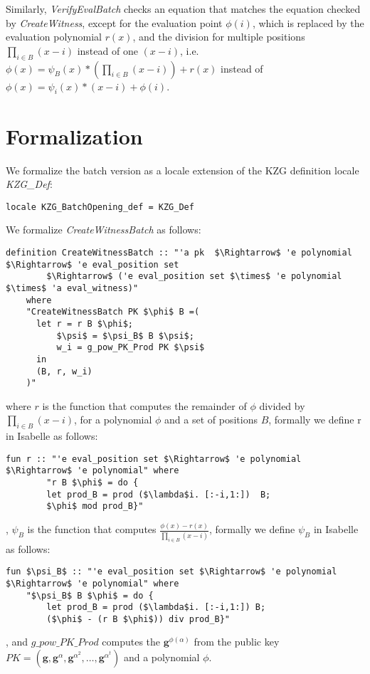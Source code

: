 Similarly, \textit{VerifyEvalBatch} checks an equation that matches the equation checked by \textit{CreateWitness}, except for the evaluation point $\phi(i)$, which is replaced by the evaluation polynomial $r(x)$, and the division for multiple positions $\prod_{i\in B}^{}(x-i)$ instead of one $(x-i)$, i.e. $\phi(x)=\psi_B(x)*(\prod_{i\in B}^{}(x-i)) + r(x)$ instead of $\phi(x)=\psi_i(x)*(x-i) + \phi(i)$.

\section*{Formalization}
We formalize the batch version as a locale extension of the KZG definition locale \textit{KZG\_Def}: 
\begin{lstlisting}[language=isabelle]
    locale KZG_BatchOpening_def = KZG_Def 
\end{lstlisting}

We formalize \textit{CreateWitnessBatch} as follows: 
\begin{lstlisting}[language=isabelle]
    definition CreateWitnessBatch :: "'a pk  $\Rightarrow$ 'e polynomial $\Rightarrow$ 'e eval_position set 
        $\Rightarrow$ ('e eval_position set $\times$ 'e polynomial $\times$ 'a eval_witness)"
    where
    "CreateWitnessBatch PK $\phi$ B =( 
      let r = r B $\phi$;
          $\psi$ = $\psi_B$ B $\psi$; 
          w_i = g_pow_PK_Prod PK $\psi$
      in
      (B, r, w_i)
    )"     
\end{lstlisting}
where $r$ is the function that computes the remainder of $\phi$ divided by $\prod_{i\in B}^{}(x-i)$, for a polynomial $\phi$ and a set of positions $B$, formally we define r in Isabelle as follows: 
\begin{lstlisting}[language=isabelle]
    fun r :: "'e eval_position set $\Rightarrow$ 'e polynomial $\Rightarrow$ 'e polynomial" where
        "r B $\phi$ = do {
        let prod_B = prod ($\lambda$i. [:-i,1:])  B;
        $\phi$ mod prod_B}"    
\end{lstlisting},
$\psi_B$ is the function that computes $\frac{\phi(x)-r(x)}{\prod_{i\in B}^{}(x-i)}$, formally we define $\psi_B$ in Isabelle as follows: 
\begin{lstlisting}[language=isabelle]
    fun $\psi_B$ :: "'e eval_position set $\Rightarrow$ 'e polynomial $\Rightarrow$ 'e polynomial" where
    "$\psi_B$ B $\phi$ = do {
        let prod_B = prod ($\lambda$i. [:-i,1:]) B;
        ($\phi$ - (r B $\phi$)) div prod_B}"
\end{lstlisting},
and $g\_pow\_PK\_Prod$ computes the $\mathbf{g}^{\phi(\alpha)}$ from the public key $PK = (\mathbf{g}, \mathbf{g}^\alpha, \mathbf{g}^{\alpha^2}, \dots, \mathbf{g}^{\alpha^t})$ and a polynomial $\phi$.

